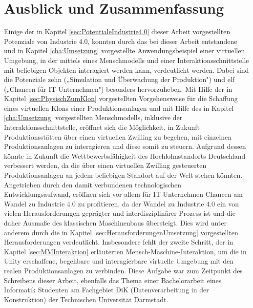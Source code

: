 \chapter{Ausblick und Zusammenfassung}\label{cha:AusblickUndFazit}

Einige der in Kapitel \ref{sec:PotentialeIndustrie4.0} dieser Arbeit vorgestellten Potenziale von Industrie 4.0, konnten durch das bei dieser Arbeit entstandene und in Kapitel \ref{cha:Umsetzung} vorgestellte Anwendungsbeispiel einer virtuellen Umgebung, in der mittels eines Menschmodells und einer Interaktionsschnittstelle mit beliebigen Objekten interagiert werden kann, verdeutlicht werden. Dabei sind die Potenziale zehn („Simulation und Überwachung der Produktion") und elf („Chancen für IT-Unternehmen") besonders hervorzuheben.
\newline
Mit Hilfe der in Kapitel \ref{sec:PhysischZumKlon} vorgestellten Vorgehensweise für die Schaffung eines virtuellen Klons einer Produktionsanlagen und mit Hilfe des in Kapitel \ref{cha:Umsetzung} vorgestellten Menschmodells, inklusive der Interaktionsschnittstelle, eröffnet sich die Möglichkeit, in Zukunft Produktionsstätten über einen virtuellen Zwilling zu begehen, mit einzelnen Produktionsanlagen zu interagieren und diese somit zu steuern. Aufgrund dessen könnte in Zukunft die Wettbewerbsfähigkeit des Hochlohnstandorts Deutschland verbessert werden, da die über einen virtuellen Zwilling gesteuerten Produktionsanlagen an jedem beliebigen Standort auf der Welt stehen könnten.
\newline
Angetrieben durch den damit verbundenen technologischen Entwicklungsaufwand, eröffnen sich vor allem für IT-Unternehmen Chancen am Wandel zu Industrie 4.0 zu profitieren, da der Wandel zu Industrie 4.0 ein von vielen Herausforderungen geprägter und interdisziplinärer Prozess ist und die daher Ausmaße des klassischen Maschinenbaus übersteigt. Dies wird unter anderem durch die in Kapitel \ref{sec:HerausforderungenUmsetzung} vorgestellten Herausforderungen verdeutlicht. Insbesondere fehlt der zweite Schritt, der in Kapitel \ref{sec:MMInteraktion} erläuterten Mensch-Maschine-Interaktion, um die in Unity erschaffene, begehbare und interagierbare virtuelle Umgebung mit den realen Produktionsanlagen zu verbinden. Diese Aufgabe war zum Zeitpunkt des Schreibens dieser Arbeit, ebenfalls das Thema einer Bachelorarbeit eines Informatik Studenten am Fachgebiet DiK (Datenverarbeitung in der Konstruktion) der Technischen Universität Darmstadt.

